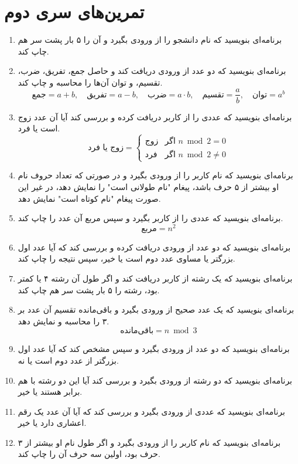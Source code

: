 \documentclass[a4paper,12pt]{article}
\begin{document}
	\newpage
	\section*{تمرین‌های سری دوم}
	\begin{enumerate}
		
		\item برنامه‌ای بنویسید که نام دانشجو را از ورودی بگیرد و آن را ۵ بار پشت سر هم چاپ کند.
		\item برنامه‌ای بنویسید که دو عدد از ورودی دریافت کند و حاصل جمع، تفریق، ضرب، تقسیم، و توان آن‌ها را محاسبه و چاپ کند.
		\[ 
		\text{جمع} = a + b, \quad 
		\text{تفریق} = a - b, \quad 
		\text{ضرب} = a \cdot b, \quad 
		\text{تقسیم} = \frac{a}{b}, \quad 
		\text{توان} = a^b
		\]
		\item برنامه‌ای بنویسید که عددی را از کاربر دریافت کرده و بررسی کند آیا آن عدد زوج است یا فرد.
		\[ 
		\text{زوج یا فرد} = 
		\begin{cases} 
			\text{زوج} & \text{اگر } n \bmod 2 = 0 \\ 
			\text{فرد} & \text{اگر } n \bmod 2 \neq 0 
		\end{cases} 
		\]
		\item برنامه‌ای بنویسید که نام کاربر را از ورودی بگیرد و در صورتی که تعداد حروف نام او بیشتر از ۵ حرف باشد، پیغام "نام طولانی است" را نمایش دهد، در غیر این صورت پیغام "نام کوتاه است" نمایش دهد.
		\item برنامه‌ای بنویسید که عددی را از کاربر بگیرد و سپس مربع آن عدد را چاپ کند.
		\[ 
		\text{مربع} = n^2 
		\]
		\item برنامه‌ای بنویسید که دو عدد از ورودی دریافت کرده و بررسی کند که آیا عدد اول بزرگتر یا مساوی عدد دوم است یا خیر، سپس نتیجه را چاپ کند.
		\item برنامه‌ای بنویسید که یک رشته از کاربر دریافت کند و اگر طول آن رشته ۴ یا کمتر بود، رشته را ۵ بار پشت سر هم چاپ کند.
		\item برنامه‌ای بنویسید که یک عدد صحیح از ورودی بگیرد و باقی‌مانده تقسیم آن عدد بر ۳ را محاسبه و نمایش دهد.
		\[ 
		\text{باقی‌مانده} = n \bmod 3 
		\]
		\item برنامه‌ای بنویسید که دو عدد از ورودی بگیرد و سپس مشخص کند که آیا عدد اول بزرگتر از عدد دوم است یا نه.
		\item برنامه‌ای بنویسید که دو رشته از ورودی بگیرد و بررسی کند آیا این دو رشته با هم برابر هستند یا خیر.
		\item برنامه‌ای بنویسید که عددی از ورودی بگیرد و بررسی کند که آیا آن عدد یک رقم اعشاری دارد یا خیر.
		\item برنامه‌ای بنویسید که نام کاربر را از ورودی بگیرد و اگر طول نام او بیشتر از ۳ حرف بود، اولین سه حرف آن را چاپ کند.

\end{enumerate}
\end{document}
